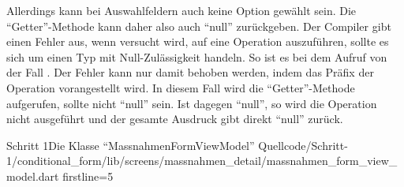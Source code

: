 Allerdings kann bei Auswahlfeldern auch keine Option gewählt sein.
Die \enquote{Getter}-Methode  kann daher also auch \enquote{null} zurückgeben.  
Der Compiler gibt einen Fehler aus, wenn versucht wird, auf  eine Operation auszuführen, sollte es sich um einen Typ mit Null-Zulässigkeit handeln.
So ist es bei dem Aufruf von  der Fall .
Der Fehler kann nur damit behoben werden, indem das Präfix   der Operation vorangestellt wird.
In diesem Fall wird die \enquote{Getter}-Methode  aufgerufen, sollte  nicht \enquote{null} sein.  
Ist  dagegen \enquote{null}, so wird die Operation nicht ausgeführt und der gesamte Ausdruck gibt direkt \enquote{null} zurück.

\begin{alexlisting}{Schritt 1}{Die Klasse \enquote{MassnahmenFormViewModel}}
  {Quellcode/Schritt-1/conditional_form/lib/screens/massnahmen_detail/massnahmen_form_view_model.dart}
  {firstline=5}
  \label{lst:Schritt1KlasseMassnahmenFormViewModel}
\end{alexlisting}